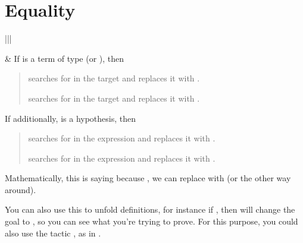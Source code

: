 \documentclass[letterpaper,10pt,english]{sphinxmanual}
\begin{document}
\section{Equality}
\label{\detokenize{tactics:equality}}

\begin{savenotes}\sphinxattablestart
\centering
\begin{tabular}[t]{|||}
\hline

\sphinxAtStartPar
{}
&
\sphinxAtStartPar
If  is a term of type  (or ), then
\begin{quote}

\sphinxAtStartPar
{} searches for  in the target and replaces it with .

\sphinxAtStartPar
{} searches for  in the target and replaces it with .
\end{quote}

\sphinxAtStartPar
If additionally,  is a hypothesis, then
\begin{quote}

\sphinxAtStartPar
{} searches for  in the expression  and replaces it with .

\sphinxAtStartPar
{} searches for  in the expression  and replaces it with .
\end{quote}

\sphinxAtStartPar
Mathematically, this is saying because , we can replace  with  (or the other way around).

\sphinxAtStartPar
You can also use this to unfold definitions, for instance if , then
 will change the goal  to
, so you can see what you’re trying to prove.
For this purpose, you could also use the tactic , as in .
\\
\hline
\end{tabular}
\par
\sphinxattableend\end{savenotes}
\end{document}
